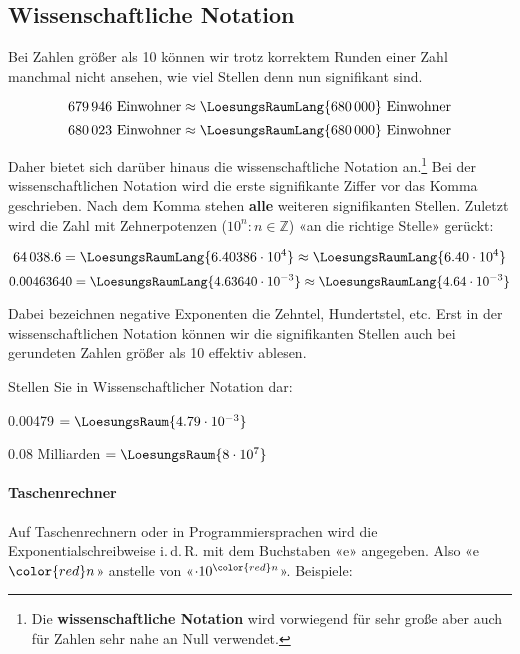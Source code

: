 
\subsection{Wissenschaftliche Notation}\label{wissenschaftlicheNotation}
Bei Zahlen größer als 10 können wir trotz korrektem Runden einer Zahl manchmal nicht ansehen, wie viel Stellen denn nun signifikant sind.

$$ 679\,946 \text{\ Einwohner} \approx  \LoesungsRaumLang{680\,000} \text{\ Einwohner}$$
$$ 680\,023 \text{\ Einwohner} \approx  \LoesungsRaumLang{680\,000} \text{\ Einwohner}$$

Daher bietet sich darüber hinaus die wissenschaftliche Notation an.\footnote{Die
\textbf{wissenschaftliche Notation} wird vorwiegend für sehr große
aber auch für Zahlen sehr nahe an Null verwendet.}
Bei der wissenschaftlichen Notation wird die erste signifikante Ziffer
vor das Komma geschrieben. Nach dem Komma stehen \textbf{alle} weiteren signifikanten Stellen.
Zuletzt wird die Zahl mit Zehnerpotenzen
($10^{n}: n \in \mathbb{Z}$) «an die richtige Stelle» gerückt:

$$64\,038.6  = \LoesungsRaumLang{6.40386 \cdot 10^{ 4}} \approx \LoesungsRaumLang{6.40 \cdot 10^{ 4}}$$
$$0.00463640 = \LoesungsRaumLang{4.63640 \cdot 10^{-3}} \approx \LoesungsRaumLang{4.64 \cdot 10^{-3}}$$

Dabei bezeichnen negative Exponenten die Zehntel, Hundertstel, etc.
Erst in der wissenschaftlichen Notation können wir die signifikanten Stellen auch bei gerundeten Zahlen größer als 10 effektiv ablesen.


Stellen Sie in Wissenschaftlicher Notation dar:

0.00479 $= \LoesungsRaum{4.79 \cdot{}10^{-3}}$

0.08 Milliarden $= \LoesungsRaum{8\cdot{}10^7}$



\newpage

\paragraph{Taschenrechner} Auf Taschenrechnern oder in
Programmiersprachen wird die Exponentialschreibweise i.\,d.\,R. mit dem
Buchstaben «e» angegeben. Also «e$\color{red}n$» anstelle von «$\cdot10^{\color{red}n}$». Beispiele:

